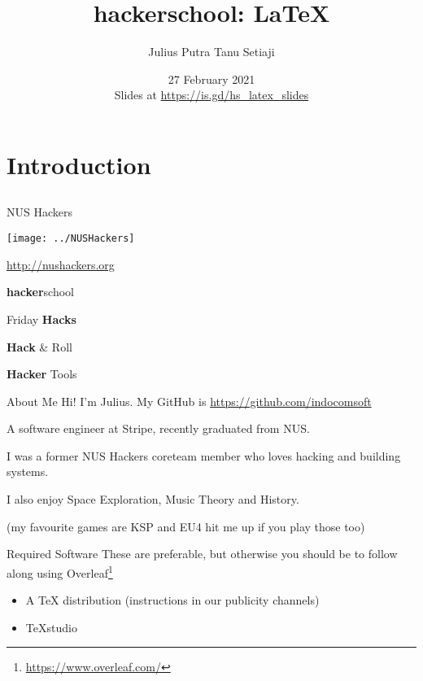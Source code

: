 \documentclass[12pt]{beamer}
\title{hackerschool: \LaTeX{}}
\author{Julius Putra Tanu Setiaji}
\date{27 February 2021 \\ Slides at \url{https://is.gd/hs_latex_slides}}
\begin{document}
\frame[plain]{\titlepage}

\section{Introduction}
\subsection{}

\begin{frame}{NUS Hackers}

  \begin{center}
    \texttt{[image: ../NUSHackers]}

    \url{http://nushackers.org}
  \end{center}

  \begin{center}
    \textbf{hacker}school

    Friday \textbf{Hacks}

    \textbf{Hack} \& Roll

    \textbf{Hacker} Tools
  \end{center}

\end{frame}

\begin{frame}{About Me}
  Hi! I'm Julius. My GitHub is \url{https://github.com/indocomsoft}

  A software engineer at Stripe, recently graduated from NUS.

  I was a former NUS Hackers coreteam member who loves hacking and building systems.

  I also enjoy Space Exploration, Music Theory and History.

    {\tiny (my favourite games are KSP and EU4 hit me up if you play those too)}
\end{frame}

\begin{frame}{Required Software}
  These are preferable, but otherwise you should be to follow along using Overleaf\footnote{\url{https://www.overleaf.com/}}
  \begin{itemize}
    \item A \TeX{} distribution (instructions in our publicity channels)
    \item TeXstudio
  \end{itemize}
\end{frame}
\end{document}
